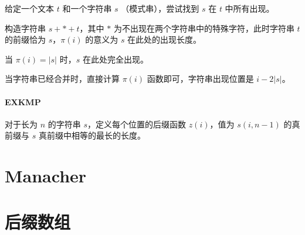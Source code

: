\documentclass{probook}
\begin{document}
\begin{multicols}{2}
给定一个文本 $t$ 和一个字符串 $s$ （模式串），尝试找到 $s$ 在 $t$ 中所有出现。

构造字符串 $s+*+t$，其中 $*$ 为不出现在两个字符串中的特殊字符，此时字符串 $t$ 的前缀恰为 $s$，$\pi(i)$ 的意义为 $s$ 在此处的出现长度。

当 $\pi(i)=|s|$ 时，$s$ 在此处完全出现。

当字符串已经合并时，直接计算 $\pi(i)$ 函数即可，字符串出现位置是 $i-2|s|$。



\paragraph{EXKMP}

对于长为 $n$ 的字符串 $s$，定义每个位置的后缀函数 $z(i)$，值为 $s(i,n-1)$ 的真前缀与 $s$ 真前缀中相等的最长的长度。



\section{Manacher}



\section{后缀数组}





\end{multicols}
\end{document}
